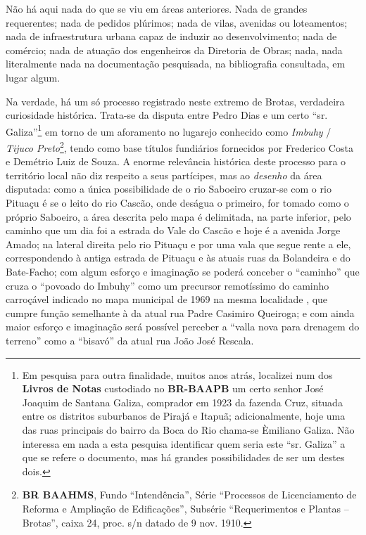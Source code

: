 



Não há aqui nada do que se viu em áreas anteriores. Nada de grandes requerentes; nada de pedidos plúrimos; nada de vilas, avenidas ou loteamentos; nada de infraestrutura urbana capaz de induzir ao desenvolvimento; nada de comércio; nada de atuação dos engenheiros da Diretoria de Obras; nada, nada literalmente nada na documentação pesquisada, na bibliografia consultada, em lugar algum. 

Na verdade, há um só processo registrado neste extremo de Brotas, verdadeira curiosidade histórica. Trata-se da disputa entre Pedro Dias e um certo ``sr. Galiza''\footnote{Em pesquisa para outra finalidade, muitos anos atrás, localizei num dos \textbf{Livros de Notas} custodiado no \textbf{BR-BAAPB} um certo senhor José Joaquim de Santana Galiza, comprador em 1923 da fazenda Cruz, situada entre os distritos suburbanos de Pirajá e Itapuã; adicionalmente, hoje uma das ruas principais do bairro da Boca do Rio chama-se Èmiliano Galiza. Não interessa em nada a esta pesquisa identificar quem seria este ``sr. Galiza'' a que se refere o documento, mas há grandes possibilidades de ser um destes dois.} em torno de um aforamento no lugarejo conhecido como \textit{Imbuhy} / \textit{Tijuco Preto}\footnote{\textbf{BR BAAHMS}, Fundo ``Intendência'', Série ``Processos de Licenciamento de Reforma e Ampliação de Edificações'', Subsérie ``Requerimentos e Plantas -- Brotas'', caixa 24, proc. s/n datado de 9 nov. 1910.}, tendo como base títulos fundiários fornecidos por Frederico Costa e Demétrio Luiz de Souza. A enorme relevância histórica deste processo para o território local não diz respeito a seus partícipes, mas ao \textit{desenho} da área disputada: como a única possibilidade de o rio Saboeiro cruzar-se com o rio Pituaçu é se o leito do rio Cascão, onde deságua o primeiro, for tomado como o próprio Saboeiro, a área descrita pelo mapa é delimitada, na parte inferior, pelo caminho que um dia foi a estrada do Vale do Cascão \cite{salvador_mapa_1969} e hoje é a avenida Jorge Amado; na lateral direita pelo rio Pituaçu e por uma vala que segue rente a ele, correspondendo à antiga estrada de Pituaçu \cite{salvador_mapa_1969} e às atuais ruas da Bolandeira e do Bate-Facho; com algum esforço e imaginação se poderá conceber o ``caminho'' que cruza o ``povoado do Imbuhy'' como um precursor remotíssimo do caminho carroçável indicado no mapa municipal de 1969 na mesma localidade \cite{salvador_mapa_1969}, que cumpre função semelhante à da atual rua Padre Casimiro Queiroga; e com ainda maior esforço e imaginação será possível perceber a ``valla nova para drenagem do terreno'' como a ``bisavó'' da atual rua João José Rescala. 

